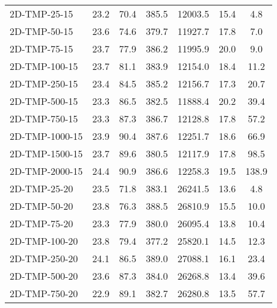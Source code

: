 \documentclass{article}
\begin{document}
\begin{table}[h]
\begin{center}
\begin{tabular}{|l||c|c|c|c|c|c|}
            2D-TMP-25-15                   & 23.2      & 70.4       & 385.5       & 12003.5  & 15.4      & 4.8        \\
            2D-TMP-50-15                   & 23.6      & 74.6       & 379.7       & 11927.7  & 17.8      & 7.0        \\
            2D-TMP-75-15                   & 23.7      & 77.9       & 386.2       & 11995.9  & 20.0      & 9.0        \\
            2D-TMP-100-15                  & 23.7      & 81.1       & 383.9       & 12154.0  & 18.4      & 11.2       \\
            2D-TMP-250-15                  & 23.4      & 84.5       & 385.2       & 12156.7  & 17.3      & 20.7       \\
            2D-TMP-500-15                  & 23.3      & 86.5       & 382.5       & 11888.4  & 20.2      & 39.4       \\
            2D-TMP-750-15                  & 23.3      & 87.3       & 386.7       & 12128.8  & 17.8      & 57.2       \\
            2D-TMP-1000-15                 & 23.9      & 90.4       & 387.6       & 12251.7  & 18.6      & 66.9       \\
            2D-TMP-1500-15                 & 23.7      & 89.6       & 380.5       & 12117.9  & 17.8      & 98.5       \\
            2D-TMP-2000-15                 & 24.4      & 90.9       & 386.6       & 12258.3  & 19.5      & 138.9      \\
            \hline
            2D-TMP-25-20                   & 23.5      & 71.8       & 383.1       & 26241.5  & 13.6      & 4.8        \\
            2D-TMP-50-20                   & 23.8      & 76.3       & 388.5       & 26810.9  & 15.5      & 10.0       \\
            2D-TMP-75-20                   & 23.3      & 77.9       & 380.0       & 26095.4  & 13.8      & 10.4       \\
            2D-TMP-100-20                  & 23.8      & 79.4       & 377.2       & 25820.1  & 14.5      & 12.3       \\
            2D-TMP-250-20                  & 24.1      & 86.5       & 389.0       & 27088.1  & 16.1      & 23.4       \\
            2D-TMP-500-20                  & 23.6      & 87.3       & 384.0       & 26268.8  & 13.4      & 39.6       \\
            2D-TMP-750-20                  & 22.9      & 89.1       & 382.7       & 26280.8  & 13.5      & 57.7       \\

\end{tabular}
\end{center}
\end{table}
\end{document}
